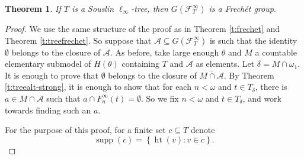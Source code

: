 \documentclass{amsart}
\theoremstyle{plain}
\newtheorem{theorem}{Theorem}[section]
\theoremstyle{definition}
\numberwithin{equation}{section}
\renewcommand{\d}{\delta}
\renewcommand{\o}{\omega}
\newcommand{\ps}{\emptyset}
\newcommand{\sst}{\subseteq}
\newcommand{\ft}{\mathcal F^{\infty}_T}
\newcommand{\set}[1]{\left\{#1\right\}}
\newcommand{\supp}{\operatorname{supp}}
\newcommand{\h}{\operatorname{ht}}
\begin{document}
\begin{theorem}
	If $T$ is a Souslin $\ell_{\infty}$-tree, then $G(\ft)$ is a Frech\'et group.
\end{theorem}
\begin{proof}
	We use the same structure of the proof as in Theorem \ref{t:frechet} and Theorem \ref{t:treefrechet}.
	So suppose that $\mathcal A\sst G(\ft)$ is such that the identity $\ps$ belongs to the closure of $\mathcal A$.
	As before, take large enough $\theta$ and $M$ a countable elementary submodel of $H(\theta)$ containing $T$ and $\mathcal A$ as elements.
	Let $\d=M\cap\o_1$.
	It is enough to prove that $\ps$ belongs to the closure of $\overline{M\cap \mathcal A}$.
	By Theorem \ref{t:treealt-strong}, it is enough to show that for each $n<\o$ and $t\in T_{\d}$, there is $a\in M\cap\mathcal A$ such that $a\cap F^{\infty}_n(t)=\ps$.
	So we fix $n<\o$ and $t\in T_{\d}$, and work towards finding such an $a$.

	For the purpose of this proof, for a finite set $c\sst T$ denote $$\supp(c)=\set{\h(v):v\in c}.$$


\end{proof}
\end{document}
